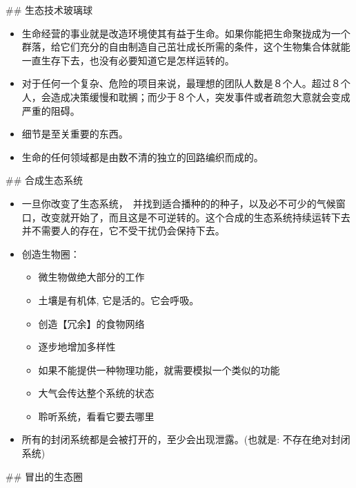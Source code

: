 \documentclass[11pt]{article}
\begin{document}
\#\# 生态技术玻璃球

\begin{itemize}
\item 生命经营的事业就是改造环境使其有益于生命。如果你能把生命聚拢成为一个群落，给它们充分的自由制造自己茁壮成长所需的条件，这个生物集合体就能一直生存下去，也没有必要知道它是怎样运转的。
\item 对于任何一个复杂、危险的项目来说，最理想的团队人数是８个人。超过８个人，会造成决策缓慢和耽搁；而少于８个人，突发事件或者疏忽大意就会变成严重的阻碍。
\item 细节是至关重要的东西。
\item 生命的任何领域都是由数不清的独立的回路编织而成的。
\end{itemize}

\#\# 合成生态系统

\begin{itemize}
\item 一旦你改变了生态系统，　并找到适合播种的的种子，以及必不可少的气候窗口，改变就开始了，而且这是不可逆转的。这个合成的生态系统持续运转下去并不需要人的存在，它不受干扰仍会保持下去。
\item 创造生物圈：
\begin{itemize}
\item 微生物做绝大部分的工作
\item 土壤是有机体, 它是活的。它会呼吸。
\item 创造【冗余】的食物网络
\item 逐步地增加多样性
\item 如果不能提供一种物理功能，就需要模拟一个类似的功能
\item 大气会传达整个系统的状态
\item 聆听系统，看看它要去哪里
\end{itemize}
\item 所有的封闭系统都是会被打开的，至少会出现泄露。(也就是: 不存在绝对封闭系统)
\end{itemize}
\#\# 冒出的生态圈
\end{document}

